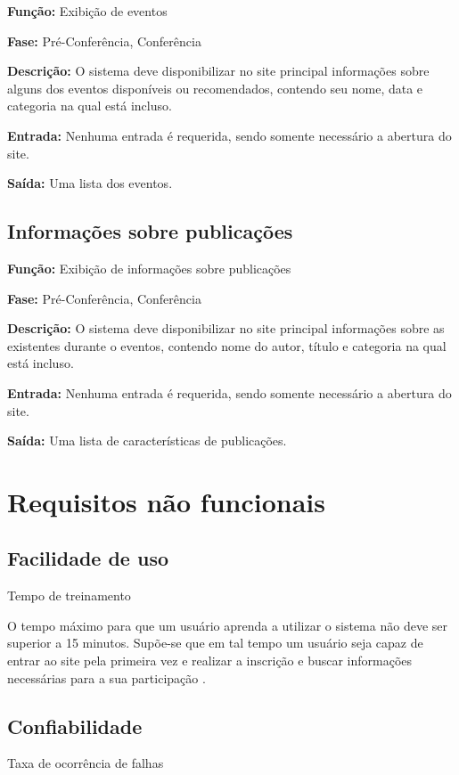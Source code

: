 \documentclass[letter]{article}
\begin{document}
\textbf{Função:} Exibição de eventos

\textbf{Fase:} Pré-Conferência, Conferência

\textbf{Descrição:} O sistema deve disponibilizar no site principal informações sobre alguns dos eventos disponíveis ou recomendados, contendo seu 
nome, data e categoria na qual está incluso.

\textbf{Entrada:} Nenhuma entrada é requerida, sendo somente necessário a
abertura do site.

\textbf{Saída:} Uma lista dos eventos.



\subsection{Informações sobre publicações}

\textbf{Função:} Exibição de informações sobre publicações

\textbf{Fase:} Pré-Conferência, Conferência

\textbf{Descrição:} O sistema deve disponibilizar no site principal informações sobre as existentes durante o eventos, contendo nome do autor, título e categoria na qual está incluso.

\textbf{Entrada:} Nenhuma entrada é requerida, sendo somente necessário a
abertura do site.

\textbf{Saída:} Uma lista de características de publicações.

\section{Requisitos não funcionais}

\subsection{ Facilidade de uso}
\textbullet Tempo de treinamento

O tempo máximo para que um usuário aprenda a utilizar o sistema não deve ser superior a 15 minutos.
Supõe-se que em tal tempo um usuário seja capaz de entrar ao site 
pela primeira vez e realizar a inscrição e buscar informações necessárias para a sua participação .


\subsection{Confiabilidade}
\textbullet\hspace{1mm} Taxa de ocorrência de falhas
\end{document}
